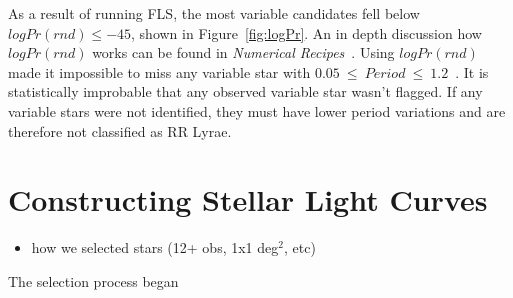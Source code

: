 \documentclass[aps,prb,twocolumn,superscriptaddress]{revtex4-1}
\begin{document}
As a result of running FLS, the most variable candidates fell below $logPr(rnd)\leq-45$, shown in Figure~\ref{fig:logPr}.  An in depth discussion how $logPr(rnd)$ works can be found in \textit{Numerical Recipes}~\cite{logPr, Numerical}.  Using $logPr(rnd)$ made it impossible 
to miss any variable star with $0.05~\leq~Period~\leq~1.2$~\cite{AAVSO}.  It is statistically improbable that any observed variable star wasn't flagged.  If any variable stars were not identified, they must have lower period variations and are therefore not classified as RR Lyrae.




\iffalse
of all 1.5 billion stars in our FOV we scanned the most variable $(logPr(rnd)<=45)$\\
  - located: ${{{cd /home/rr_lyrae/logprob_below_neg45_take2}}}$\\
  - 1558 stars\\
new grouping list that DH wanted (after removing aliased regions)\\
  - located: ${{{cd /home/rr_lyrae/alias_rm_grps}}}$\\
  - 776 stars\\
\fi


\section{Constructing Stellar Light Curves}


\begin{itemize}
	\item{} how we selected stars (12+ obs, 1x1 deg$^2$, etc)
\end{itemize}

The selection process began


\end{document}

